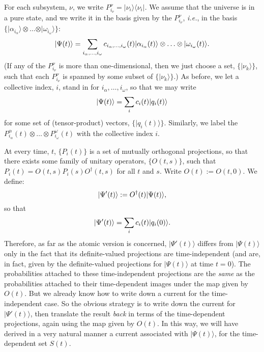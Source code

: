 \documentclass[12pt]{article}
\newcommand{\be}{\vspace*{6pt} \begin{equation}}
\newcommand{\ee}{\vspace*{10pt} \end{equation}}
\newcommand{\ie}{{\it i.e.}}         %
\newcommand{\ga}{\alpha}                                        %
\newcommand{\gn}{\nu}                                           %
\newcommand{\gw}{\omega}                                        %
\newcommand{\bra}[1]{\langle #1\vert}                           %
\newcommand{\ket}[1]{\vert #1\rangle}                           %
\begin{document}
For each subsystem, $\gn$, we write $P^\gn_{i_\gn} = 
\ket{\gn_i}\bra{\gn_i}$.  We assume that the universe is in a pure 
state, and we write it in the basis given by the $P^\gn_{i_\gn}$, \ie, 
in the basis $\{\ket{\ga_{i_\ga}} \otimes
\ldots \otimes \ket{\gw_{i_\gw}}\}$:
\be
  \label{eq:universe}
  \ket{\Psi(t)} = \sum_{i_\ga, \ldots , i_\gw} c_{i_\ga, \ldots , 
  i_\gw}(t) \ket{\ga_{i_\ga}(t)} \otimes \ldots \otimes 
  \ket{\gw_{i_\gw}(t)}.
\ee
(If any of the $P^\gn_{i_\gn}$ is more than one-dimensional, then we 
just choose a set, $\{\ket{\gn_k}\}$, such that each $P^\gn_{i_\gn}$ 
is spanned by some subset of $\{\ket{\gn_k}\}$.) As before, we let a 
collective index, $i$, stand in for $i_\ga, \ldots , i_\gw$, so that 
we may write
\be
  \label{eq:simpleuniverse}
  \ket{\Psi(t)} = \sum_i c_i(t) \ket{q_i(t)}
\ee
for some set of (tensor-product) vectors, $\{\ket{q_i(t)}\}$.  
Similarly, we label the $P^\ga_{i_\ga}(t) \otimes \ldots \otimes 
P^\gw_{i_\gw}(t)$ with the collective index $i$.

At every time, $t$, $\{P_i(t)\}$ is a set of mutually orthogonal 
projections, so that there exists some family of unitary operators, 
$\{O(t,s)\}$, such that $P_i(t) = O(t,s) P_i(s) O^{\dagger}(t,s)$ for 
all $t$ and $s$.  Write $O(t):=O(t,0)$.  We define:
\be
  \label{eq:Psiprime}
  \ket{\Psi'(t)} := O^{\dagger}(t)\ket{\Psi(t)},
\ee
so that
\be
  \label{eq:Psiprime2}
  \ket{\Psi'(t)} = \sum_i c_i(t) \ket{q_{i}(0)}.
\ee
Therefore, as far as the atomic version is concerned, $\ket{\Psi'(t)}$ 
differs from $\ket{\Psi(t)}$ only in the fact that its definite-valued 
projections are time-independent (and are, in fact, given by the 
definite-valued projections for $\ket{\Psi(t)}$ at time $t = 0$).  The 
probabilities attached to these time-independent projections are the 
{\it same} as the probabilities attached to their time-dependent 
images under the map given by $O(t)$.  But we already know how to 
write down a current for the time-independent case.  So the obvious 
strategy is to write down the current for $\ket{\Psi'(t)}$, then 
translate the result {\it back} in terms of the time-dependent 
projections, again using the map given by $O(t)$.  In this way, we 
will have derived in a very natural manner a current associated with 
$\ket{\Psi(t)}$, for the time-dependent set $S(t)$.
\end{document}
